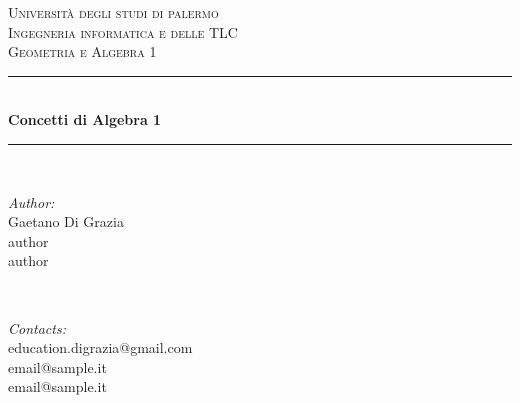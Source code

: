 \begin{titlepage}

\newcommand{\HRule}{\rule{\linewidth}{0.5mm}} %

\center %
 

\textsc{\LARGE Università degli studi di palermo}\\[1.5cm] %
\textsc{\Large Ingegneria informatica e delle TLC}\\[0.5cm] %
\textsc{\large Geometria e Algebra 1}\\[0.5cm] %


\HRule \\[0.4cm]
{ \huge \bfseries Concetti di Algebra 1}\\[0.4cm] %
\HRule \\[1.5cm]
 

\begin{minipage}{0.4\textwidth}
\begin{flushleft} \large
\emph{Author:}\\
Gaetano Di Grazia\\
author\\
author
\end{flushleft}
\end{minipage}
~
\begin{minipage}{0.4\textwidth}
\begin{flushright} \large
\emph{Contacts:} \\
education.digrazia@gmail.com\\ %
 email@sample.it\\ %
 email@sample.it %
\end{flushright}
\end{minipage}\\[2cm]


\end{titlepage}
